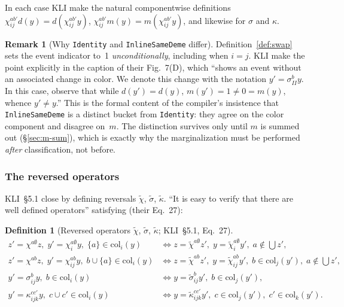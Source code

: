 \documentclass[11pt,leqno]{article}
\newcommand{\code}[1]{\texttt{#1}}
\theoremstyle{plain}
\theoremstyle{definition}
\newtheorem{definition}[theorem]{Definition}
\newtheorem{remark}[theorem]{Remark}
\begin{document}
In each case KLI make the natural componentwise definitions
$\chi^{ab'}_{ij} d(y) = d(\chi^{ab'}_{ij} y)$,
$\chi^{ab'}_{ij} m(y) = m(\chi^{ab'}_{ij} y)$, and likewise for
$\sigma$ and $\kappa$.

\begin{remark}[Why \code{Identity} and \code{InlineSameDeme} differ]
\label{rem:sigma-ii}
Definition~\ref{def:swap} sets the event indicator to~1
\emph{unconditionally}, including when $i = j$.  KLI make the point
explicitly in the caption of their Fig.~7(D), which ``shows an event
without an associated change in color.  We denote this change with the
notation $y' = \sigma^{b}_{II} y$.  In this case, observe that while
$d(y') = d(y)$, $m(y') = 1 \ne 0 = m(y)$, whence $y' \ne y$.''  This
is the formal content of the compiler's insistence that
\code{InlineSameDeme} is a distinct bucket from \code{Identity}: they
agree on the color component and disagree on~$m$.  The distinction
survives only until $m$ is summed out (\S\ref{sec:m-sum}), which is
exactly why the marginalization must be performed \emph{after}
classification, not before.
\end{remark}

\subsubsection{The reversed operators}

KLI~\S5.1 close by defining reversals $\tilde{\chi}$, $\tilde{\sigma}$,
$\tilde{\kappa}$.  ``It is easy to verify that there are well defined
operators'' satisfying (their Eq.~27):

\begin{definition}[Reversed operators $\tilde{\chi}$, $\tilde{\sigma}$,
$\tilde{\kappa}$; KLI~\S5.1, Eq.~27]
\label{def:reversed}
\begin{equation}\label{eq:reversals}
  \begin{aligned}
    z' = \chi^{a\emptyset} z,\;
      y' = \chi^{a\emptyset}_{i} y,\;
      \{a\} \in \mathrm{col}_i(y)
    &\iff
      z = \tilde{\chi}^{a\emptyset} z',\;
      y = \tilde{\chi}^{a\emptyset}_{i} y',\;
      a \notin \textstyle\bigcup z',\\
    z' = \chi^{ab} z,\;
      y' = \chi^{ab}_{ij} y,\;
      b \cup \{a\} \in \mathrm{col}_i(y)
    &\iff
      z = \tilde{\chi}^{ab} z',\;
      y = \tilde{\chi}^{ab}_{ij} y',\;
      b \in \mathrm{col}_j(y'),\;
      a \notin \textstyle\bigcup z',\\
    y' = \sigma^{b}_{ij} y,\;
      b \in \mathrm{col}_i(y)
    &\iff
      y = \tilde{\sigma}^{b}_{ij} y',\;
      b \in \mathrm{col}_j(y'),\\
    y' = \kappa^{cc'}_{ijk} y,\;
      c \cup c' \in \mathrm{col}_i(y)
    &\iff
      y = \tilde{\kappa}^{cc'}_{ijk} y',\;
      c \in \mathrm{col}_j(y'),\;
      c' \in \mathrm{col}_k(y').
  \end{aligned}
\end{equation}
\end{definition}
\end{document}
